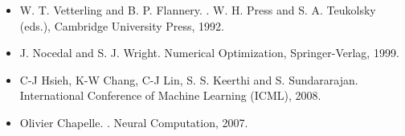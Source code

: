 
\begin{itemize}
\item W. T. Vetterling and B. P. Flannery. . \newblock W. H. Press and S. A. Teukolsky
(eds.), Cambridge University Press, 1992.
\item J. Nocedal and  S. J. Wright. Numerical Optimization, Springer-Verlag, 1999.
\item C-J Hsieh, K-W Chang, C-J Lin, S. S. Keerthi and S. Sundararajan.  \newblock International Conference of Machine Learning
(ICML), 2008.
\item Olivier Chapelle. . \newblock Neural 
Computation, 2007.
\end{itemize}

